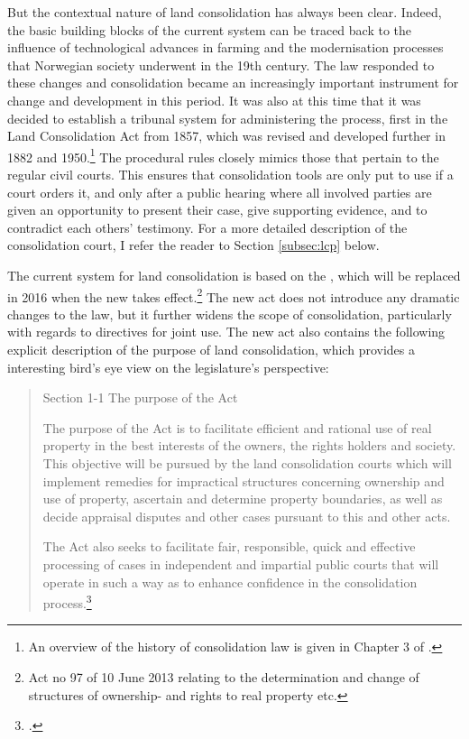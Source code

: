 But the contextual nature of land consolidation has always been clear. Indeed, the basic building blocks of the current system can be traced back to the influence of technological advances in farming and the modernisation processes that Norwegian society underwent in the 19th century. The law responded to these changes and consolidation became an increasingly important instrument for change and development in this period. It was also at this time that it was decided to establish a tribunal system for administering the process, first in the Land Consolidation Act from 1857, which was revised and developed further in 1882 and 1950.\footnote{An overview of the history of consolidation law is given in Chapter 3 of \cite{prop12}.} The procedural rules closely mimics those that pertain to the regular civil courts. This ensures that consolidation tools are only put to use if a court orders it, and only after a public hearing where all involved parties are given an opportunity to present their case, give supporting evidence, and to contradict each others' testimony. For a more detailed description of the consolidation court, I refer the reader to Section \ref{subsec:lcp} below.

The current system for land consolidation is based on the \cite{lca79}, which will be replaced in 2016 when the new \cite{lca13} takes effect.\footnote{Act no 97 of 10 June 2013 relating to the determination and change of structures of ownership- and rights to real property etc.} The new act does not introduce any dramatic changes to the law, but it further widens the scope of consolidation, particularly with regards to directives for joint use. The new act also contains the following explicit description of the purpose of land consolidation, which provides a interesting bird's eye view on the legislature's perspective:

\begin{quote}
Section 1-1 The purpose of the Act

The purpose of the Act is to facilitate efficient and rational use of real property in the best interests of the owners, the rights holders and society. This objective will be pursued by the land consolidation courts which will implement remedies for impractical structures concerning ownership and use of property, ascertain and determine property boundaries, as well as decide appraisal disputes and other cases pursuant to this and other acts.

The Act also seeks to facilitate fair, responsible, quick and effective processing of cases in independent and impartial public courts that will operate in such a way as to enhance confidence in the consolidation process.\footcite[1]{lca13}
\end{quote}

